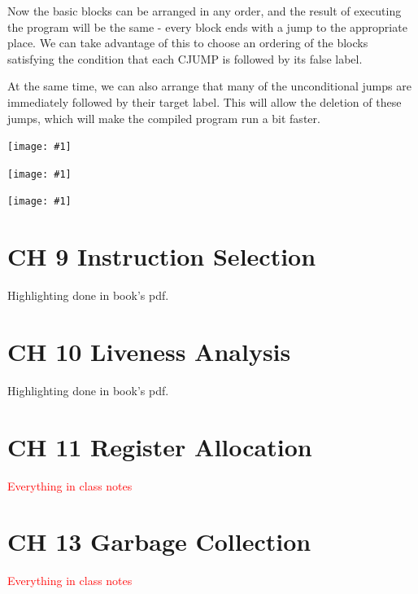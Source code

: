 \documentclass[8pt, a4paper, oneside, twocolumn]{extarticle}
\newcommand{\ph}[1]{
    \texttt{[image: \#1]}
}
\begin{document}
Now the basic blocks can be arranged in any order, and the result of executing
the program will be the same - every block ends with a jump to the 
appropriate place. We can take advantage of this to choose an ordering of the blocks
satisfying the condition that each CJUMP is followed by its false label.

At the same time, we can also arrange that many of the unconditional
jumps are immediately followed by their target label. This will allow the
deletion of these jumps, which will make the compiled program run a bit
faster.

\ph{818}

\ph{819}

\ph{820}

\section{CH 9 Instruction Selection}

Highlighting done in book's pdf.

\section{CH 10 Liveness Analysis}

Highlighting done in book's pdf.

\section{CH 11 Register Allocation}

\textcolor{red}{Everything in class notes}

\section{CH 13 Garbage Collection}

\textcolor{red}{Everything in class notes}
\end{document}
